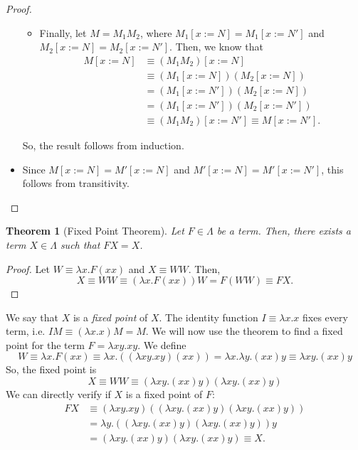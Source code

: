 \documentclass[a4paper, openany]{memoir}
\newtheorem{theorem}[proposition]{Theorem}
\theoremstyle{definition}
\begin{document}
\begin{proof}
\begin{itemize}
\begin{itemize}
                \item Finally, let $M = M_1 M_2$, where $M_1[x := N] = M_1[x := N']$ and $M_2[x := N] = M_2[x := N']$. Then, we know that
                \begin{align*}
                    M[x := N] &\equiv (M_1 M_2)[x := N] \\
                    &\equiv (M_1[x := N]) (M_2[x := N]) \\
                    &= (M_1[x := N']) (M_2[x := N]) \\
                    &= (M_1[x := N']) (M_2[x := N']) \\
                    &\equiv (M_1 M_2)[x := N'] \equiv M[x := N'].
                \end{align*}
            \end{itemize}
            So, the result follows from induction.
            
            \item Since $M[x := N] = M'[x := N]$ and $M'[x := N] = M'[x := N']$, this follows from transitivity.
        \end{itemize}
    \end{proof}

    \begin{theorem}[Fixed Point Theorem]
        Let $F \in \Lambda$ be a term. Then, there exists a term $X \in \Lambda$ such that $FX = X$.
    \end{theorem}
    \begin{proof}
        Let $W \equiv \lambda x.F(xx)$ and $X \equiv WW$. Then,
        \[X \equiv WW \equiv (\lambda x.F(xx)) W = F(WW) \equiv FX.\]
    \end{proof}
    \noindent We say that $X$ is a \emph{fixed point} of $X$. The identity function $I \equiv \lambda x.x$ fixes every term, i.e. $IM \equiv (\lambda x.x)M = M$. We will now use the theorem to find a fixed point for the term $F = \lambda xy.xy$. We define
    \[W \equiv \lambda x.F(xx) \equiv \lambda x.((\lambda xy.xy)(xx)) = \lambda x.\lambda y.(xx)y \equiv \lambda xy.(xx)y\]
    So, the fixed point is
    \[X \equiv WW \equiv (\lambda xy.(xx)y)(\lambda xy.(xx)y)\]
    We can directly verify if $X$ is a fixed point of $F$:
    \begin{align*}
        FX &\equiv (\lambda xy.xy)((\lambda xy.(xx)y)(\lambda xy.(xx)y)) \\
        &= \lambda y.((\lambda xy.(xx)y)(\lambda xy.(xx)y))y \\
        &= (\lambda xy.(xx)y)(\lambda xy.(xx)y) \equiv X.
    \end{align*}
    
\end{document}
